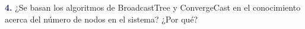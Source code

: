 \newpage
\textbf{\textcolor{MidnightBlue}{4.}}
¿Se basan los algoritmos de BroadcastTree
y ConvergeCast en el conocimiento acerca
del número de nodos en el sistema? ¿Por qué?
